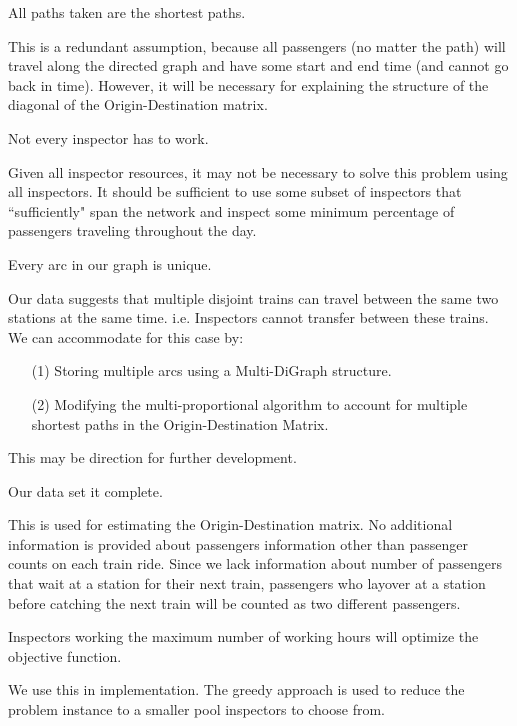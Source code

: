 \documentclass[11pt]{article}
\begin{document}
\begin{assump}
All paths taken are the shortest paths.
\end{assump}
This is a redundant assumption, because all passengers (no matter the path) will travel along the directed graph and have some start and end time (and cannot go back in time). However, it will be necessary for explaining the structure of the diagonal of the Origin-Destination matrix.

\begin{assump}
Not every inspector has to work.
\end{assump}
Given all inspector resources, it may not be necessary to solve this problem using all inspectors. It should be sufficient to use some subset of inspectors that ``sufficiently" span the network and inspect some minimum percentage of passengers traveling throughout the day.
\begin{assump}
    Every arc in our graph is unique.
\end{assump}
Our data suggests that multiple disjoint trains can travel between the same two stations at the same time. i.e. Inspectors cannot transfer between these trains. We can accommodate for this case by:
        \begin{itemize}
            \item[(1)] Storing multiple arcs using a Multi-DiGraph structure.
            \item[(2)] Modifying the multi-proportional algorithm to account for multiple shortest paths in the Origin-Destination Matrix. 
        \end{itemize}
         This may be direction for further development.
\begin{assump}
    Our data set it complete.
\end{assump}
This is used for estimating the Origin-Destination matrix. No additional information is provided about passengers information other than passenger counts on each train ride. Since we lack information about number of passengers that wait at a station for their next train, passengers who layover at a station before catching the next train will be counted as two different passengers.

\begin{assump}
     Inspectors working the maximum number of working hours will optimize the objective function.
\end{assump}
We use this in implementation. 
The greedy approach is used to reduce the problem instance to a smaller pool inspectors to choose from. 
\end{document}
